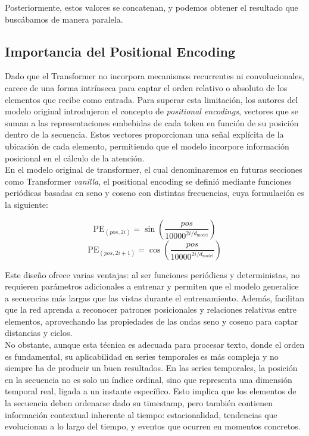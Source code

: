 Posteriormente, estos valores se concatenan, y podemos obtener el resultado que buscábamos de manera paralela.

\subsection{Importancia del Positional Encoding}

Dado que el Transformer no incorpora mecanismos recurrentes ni convolucionales, carece de una forma intrínseca para captar el orden relativo o absoluto de los elementos que recibe como entrada. Para superar esta limitación, los autores del modelo original introdujeron el concepto de \textit{positional encodings}, vectores que se suman a las representaciones embebidas de cada token en función de su posición dentro de la secuencia. Estos vectores proporcionan una señal explícita de la ubicación de cada elemento, permitiendo que el modelo incorpore información posicional en el cálculo de la atención.\\

En el modelo original de transformer, el cual denominaremos en futuras secciones como Transformer \textit{vanilla}, el positional encoding se definió mediante funciones periódicas basadas en seno y coseno con distintas frecuencias, cuya formulación es la siguiente:

\begin{equation}
    \text{PE}_{(pos, 2i)} = \sin\left( \frac{pos}{10000^{2i/d_{\text{model}}}} \right)
\end{equation}
\begin{equation}
    \text{PE}_{(pos, 2i+1)} = \cos\left( \frac{pos}{10000^{2i/d_{\text{model}}}} \right)
\end{equation}

Este diseño ofrece varias ventajas: al ser funciones periódicas y deterministas, no requieren parámetros adicionales a entrenar y permiten que el modelo generalice a secuencias más largas que las vistas durante el entrenamiento. Además, facilitan que la red aprenda a reconocer patrones posicionales y relaciones relativas entre elementos, aprovechando las propiedades de las ondas seno y coseno para captar distancias y ciclos.\\

No obstante, aunque esta técnica es adecuada para procesar texto, donde el orden es fundamental, su aplicabilidad en series temporales es más compleja y no siempre ha de producir un buen resultados. En las series temporales, la posición en la secuencia no es solo un índice ordinal, sino que representa una dimensión temporal real, ligada a un instante específico. Esto implica que los elementos de la secuencia deben ordenarse dado su timestamp, pero también contienen información contextual inherente al tiempo: estacionalidad, tendencias que evolucionan a lo largo del tiempo, y eventos que ocurren en momentos concretos.\\

